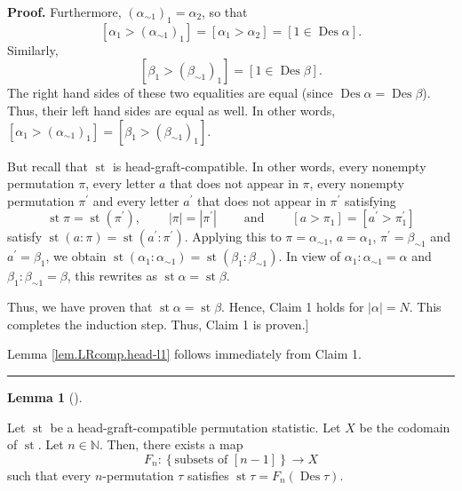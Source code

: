 \documentclass[numbers=enddot,12pt,final,onecolumn,notitlepage]{scrartcl}%
\theoremstyle{definition}
\newtheorem{lem}[theo]{Lemma}
\newenvironment{lemma}[1][]
{\begin{lem}[#1]\begin{leftbar}}
{\end{leftbar}\end{lem}}
\newenvironment{proof}[1][Proof]{\noindent\textbf{#1.} }{\ \rule{0.5em}{0.5em}}
\newenvironment{verlong}{}{}
\begin{document}
\begin{verlong}
\begin{proof}
Furthermore, $\left(  \alpha_{\sim1}\right)  _{1}=\alpha_{2}$, so that
\[
\left[  \alpha_{1}>\left(  \alpha_{\sim1}\right)  _{1}\right]  =\left[
\alpha_{1}>\alpha_{2}\right]  =\left[  1\in\operatorname{Des}\alpha\right]
.
\]
Similarly,%
\[
\left[  \beta_{1}>\left(  \beta_{\sim1}\right)  _{1}\right]  =\left[
1\in\operatorname{Des}\beta\right]  .
\]
The right hand sides of these two equalities are equal (since
$\operatorname{Des}\alpha=\operatorname{Des}\beta$). Thus, their left hand
sides are equal as well. In other words, $\left[  \alpha_{1}>\left(
\alpha_{\sim1}\right)  _{1}\right]  =\left[  \beta_{1}>\left(  \beta_{\sim
1}\right)  _{1}\right]  $.

But recall that $\operatorname{st}$ is head-graft-compatible. In other words,
every nonempty permutation $\pi$, every letter $a$ that does not appear in
$\pi$, every nonempty permutation $\pi^{\prime}$ and every letter $a^{\prime}$
that does not appear in $\pi^{\prime}$ satisfying%
\[
\operatorname{st} \pi   =\operatorname{st}\left(  \pi^{\prime
}\right)  ,\ \ \ \ \ \ \ \ \ \ \left\vert \pi\right\vert =\left\vert
\pi^{\prime}\right\vert \ \ \ \ \ \ \ \ \ \ \text{and}%
\ \ \ \ \ \ \ \ \ \ \left[  a>\pi_{1}\right]  =\left[  a^{\prime}>\pi
_{1}^{\prime}\right]
\]
satisfy $\operatorname{st}\left(  a:\pi\right)  =\operatorname{st}\left(
a^{\prime}:\pi^{\prime}\right)  $. Applying this to $\pi=\alpha_{\sim1}$,
$a=\alpha_{1}$, $\pi^{\prime}=\beta_{\sim1}$ and $a^{\prime}=\beta_{1}$, we
obtain $\operatorname{st}\left(  \alpha_{1}:\alpha_{\sim1}\right)
=\operatorname{st}\left(  \beta_{1}:\beta_{\sim1}\right)  $. In view of
$\alpha_{1}:\alpha_{\sim1}=\alpha$ and $\beta_{1}:\beta_{\sim1}=\beta$, this
rewrites as $\operatorname{st} \alpha = \operatorname{st} \beta$.

Thus, we have proven that $\operatorname{st} \alpha
= \operatorname{st} \beta$. Hence, Claim 1 holds for
$\left\vert \alpha\right\vert =N$. This completes the induction step. Thus,
Claim 1 is proven.]

Lemma \ref{lem.LRcomp.head-l1} follows immediately from Claim 1.
\end{proof}

\begin{lemma}
\label{lem.LRcomp.head-l2}Let $\operatorname{st}$ be a head-graft-compatible
permutation statistic. Let $X$ be the codomain of $\operatorname{st}$. Let
$n\in\mathbb{N}$. Then, there exists a map
\[
F_{n}:\left\{  \text{subsets of }\left[  n-1\right]  \right\}  \rightarrow X
\]
such that every $n$-permutation $\tau$ satisfies $\operatorname{st} \tau
= F_{n}\left(  \operatorname{Des}\tau\right)  $.
\end{lemma}


\end{verlong}
\end{document}

